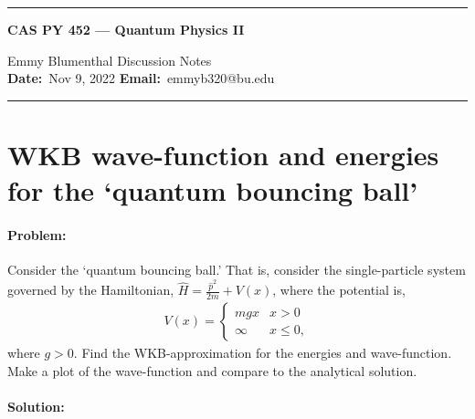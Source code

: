 \documentclass[10pt]{article}
\newcommand{\1}{\mathbf 1}
\begin{document}
\begin{center}
	\hrule
	\vspace{.4cm}
	{\textbf { \large CAS PY 452 --- Quantum Physics II}}
\end{center}
Emmy Blumenthal \hspace{\fill} \hspace{\fill}  \textbf{} Discussion Notes\  \\
\textbf{Date:}\  Nov 9, 2022   \hspace{\fill} \textbf{Email:}\ emmyb320@bu.edu
 
\vspace{.4cm}
\hrule

\section*{WKB wave-function and energies for the `quantum bouncing ball'}


\paragraph{Problem:}

Consider the `quantum bouncing ball.' That is, consider the single-particle system governed by the Hamiltonian, $\hat H = \frac{\hat p^2}{2m} + V(x)$, where the potential is,
\begin{align}
	V(x) = \begin{cases}
		m g x & x> 0\\
		\infty  & x \leq 0,
	\end{cases}
\end{align}
where $g>0$.
Find the WKB-approximation for the energies and wave-function.
Make a plot of the wave-function and compare to the analytical solution.

\paragraph{Solution:}
\end{document}
